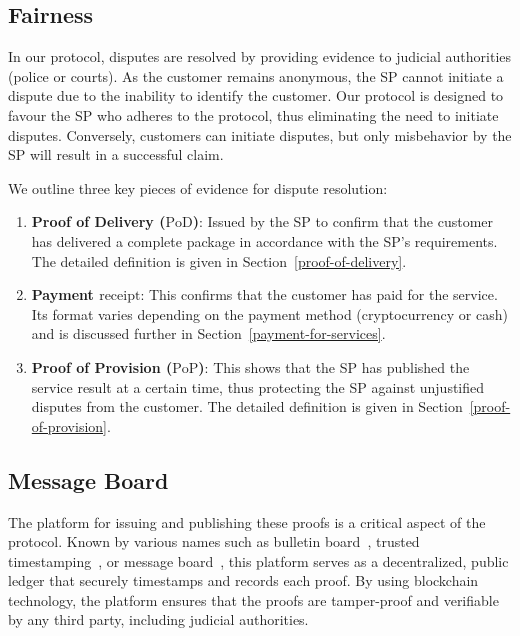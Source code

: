 \documentclass[pdftex,twocolumn,epjc3]{svjour3}
\begin{document}
\subsection{Fairness}\label{fairness}
In our protocol, disputes are resolved by providing evidence to judicial authorities (police or courts). As the customer remains anonymous, the SP cannot initiate a dispute due to the inability to identify the customer. Our protocol is designed to favour the SP who adheres to the protocol, thus eliminating the need to initiate disputes. Conversely, customers can initiate disputes, but only misbehavior by the SP will result in a successful claim.

We outline three key pieces of evidence for dispute resolution:

\begin{enumerate}
  \item \textbf{Proof of Delivery ($\textrm{PoD}$)}: Issued by the SP to confirm that the customer has delivered a complete package in accordance with the SP's requirements. The detailed definition is given in Section~\ref{proof-of-delivery}.

  \item \textbf{Payment $\textrm{receipt}$}: This confirms that the customer has paid for the service. Its format varies depending on the payment method (cryptocurrency or cash) and is discussed further in Section~\ref{payment-for-services}.

  \item \textbf{Proof of Provision ($\textrm{PoP}$)}: This shows that the SP has published the service result at a certain time, thus protecting the SP against unjustified disputes from the customer. The detailed definition is given in Section~\ref{proof-of-provision}.
\end{enumerate}

\subsection{Message Board}\label{sec:message-board}
The platform for issuing and publishing these proofs is a critical aspect of the protocol. Known by various names such as bulletin board~\cite{achenbachImprovedCoercionresistantElectronic2015}, trusted timestamping~\cite{gippDecentralizedTrustedTimestamping2015}, or message board~\cite{hinarejosSolutionSecureCertified2019}, this platform serves as a decentralized, public ledger that securely timestamps and records each proof. By using blockchain technology, the platform ensures that the proofs are tamper-proof and verifiable by any third party, including judicial authorities.
\end{document}
